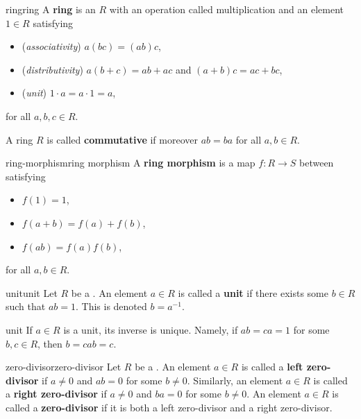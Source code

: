 \begin{topic}{ring}{ring}
    A \textbf{ring} is an  $R$ with an operation called multiplication and an element $1 \in R$ satisfying
    \begin{itemize}
        \item (\textit{associativity}) $a(bc) = (ab)c$,
        \item (\textit{distributivity}) $a(b + c) = ab + ac$ and $(a + b)c = ac + bc$,
        \item (\textit{unit}) $1 \cdot a = a \cdot 1 = a$,
    \end{itemize}
    for all $a, b, c \in R$.
    
    A ring $R$ is called \textbf{commutative} if moreover $ab = ba$ for all $a, b \in R$.
\end{topic}

\begin{topic}{ring-morphism}{ring morphism}
    A \textbf{ring morphism} is a map $f : R \to S$ between  satisfying
    \begin{itemize}
        \item $f(1) = 1$,
        \item $f(a + b) = f(a) + f(b)$,
        \item $f(ab) = f(a) f(b)$,
    \end{itemize}
    for all $a, b \in R$.
\end{topic}

\begin{topic}{unit}{unit}
    Let $R$ be a . An element $a \in R$ is called a \textbf{unit} if there exists some $b \in R$ such that $ab = 1$. This is denoted $b = a^{-1}$.
\end{topic}

\begin{example}{unit}
    If $a \in R$ is a unit, its inverse is unique. Namely, if $ab = ca = 1$ for some $b, c \in R$, then $b = cab = c$.
\end{example}

\begin{topic}{zero-divisor}{zero-divisor}
    Let $R$ be a . An element $a \in R$ is called a \textbf{left zero-divisor} if $a \ne 0$ and $ab = 0$ for some $b \ne 0$. Similarly, an element $a \in R$ is called a \textbf{right zero-divisor} if $a \ne 0$ and $ba = 0$ for some $b \ne 0$. An element $a \in R$ is called a \textbf{zero-divisor} if it is both a left zero-divisor and a right zero-divisor.
\end{topic}

